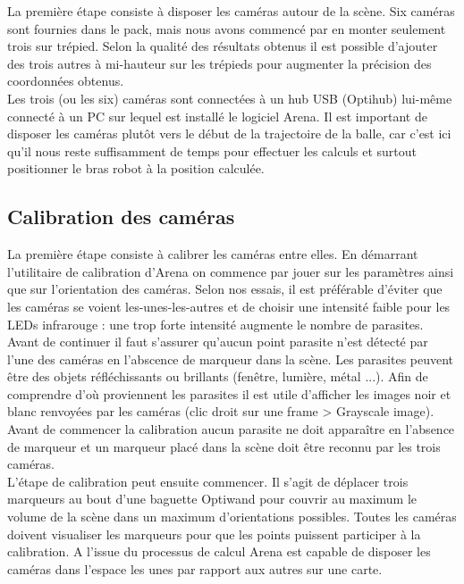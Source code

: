 \documentclass{article}[11pt]
\begin{document}
La première étape consiste à disposer les caméras autour de la scène. Six caméras sont fournies dans le pack, mais nous avons commencé par en monter seulement trois sur trépied. Selon la qualité des résultats obtenus il est possible d'ajouter des trois autres à mi-hauteur sur les trépieds pour augmenter la précision des coordonnées obtenus. \\

Les trois (ou les six) caméras sont connectées à un hub USB (Optihub) lui-même connecté à un PC sur lequel est installé le logiciel Arena. Il est important de disposer les caméras plutôt vers le début de la trajectoire de la balle, car c'est ici qu'il nous reste suffisamment de temps pour effectuer les calculs et surtout positionner le bras robot à la position calculée. \\

\subsection{Calibration des caméras}

La première étape consiste à calibrer les caméras entre elles. En démarrant l'utilitaire de calibration d'Arena on commence par jouer sur les paramètres ainsi que sur l'orientation des caméras. Selon nos essais, il est préférable d'éviter que les caméras se voient les-unes-les-autres et de choisir une intensité faible pour les LEDs infrarouge : une trop forte intensité augmente le nombre de parasites. Avant de continuer il faut s'assurer qu'aucun point parasite n'est détecté par l'une des caméras en l'abscence de marqueur dans la scène. Les parasites peuvent être des objets réfléchissants ou brillants (fenêtre, lumière, métal ...). Afin de comprendre d'où proviennent les parasites il est utile d'afficher les images noir et blanc renvoyées par les caméras (clic droit sur une frame > Grayscale image). Avant de commencer la calibration aucun parasite ne doit apparaître en l'absence de marqueur et un marqueur placé dans la scène doit être reconnu par les trois caméras. \\

L'étape de calibration peut ensuite commencer. Il s'agit de déplacer trois marqueurs au bout d'une baguette Optiwand pour couvrir au maximum le volume de la scène dans un maximum d'orientations possibles. Toutes les caméras doivent visualiser les marqueurs pour que les points puissent participer à la calibration. A l'issue du processus de calcul Arena est capable de disposer les caméras dans l'espace les unes par rapport aux autres sur une carte. \\
\end{document}
